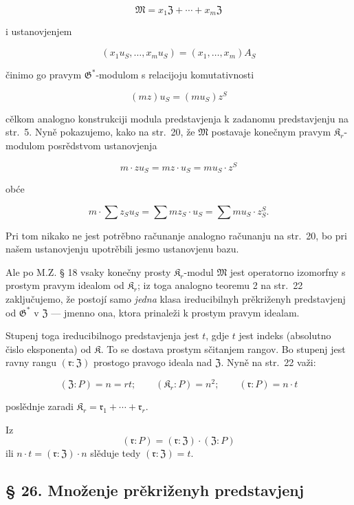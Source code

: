 \documentclass[11pt]{article}
\begin{document}
\[\mathfrak{M}=x_1\mathfrak{Z}+\cdots+x_m\mathfrak{Z}\]

i ustanovjenjem

\[(x_1u_S,\ldots,x_mu_S)=(x_1,\ldots,x_m)A_S\]

činimo go pravym \(\mathfrak G^*\)-modulom s relacijoju komutativnosti

\[(mz) u_S = (mu_S) z^S\]

cělkom analogno konstrukciji modula predstavjenja k zadanomu predstavjenju na str.~5. Nyně pokazujemo, kako na str.~20, že \(\mathfrak{M}\) postavaje konečnym pravym \(\mathfrak K_r\)-modulom posrědstvom ustanovjenja

\[m \cdot z u_S = mz \cdot u_S = mu_S \cdot z^S\]

obće

\[m \cdot \sum z_S u_S = \sum m z_S \cdot u_S = \sum m u_S \cdot z_S^S.\]

Pri tom nikako ne jest potrěbno računanje analogno računanju na str.~20, bo pri našem ustanovjenju upotrěbili jesmo ustanovjenu bazu.

Ale po M.Z. § 18 vsaky konečny prosty \(\mathfrak K_r\)-modul \(\mathfrak{M}\) jest operatorno izomorfny s prostym pravym idealom od \(\mathfrak K_r\); iz toga analogno teoremu 2 na str.~22 zaključujemo, že postojí samo \emph{jedna} klasa ireducibilnyh prěkriženyh predstavjenj od \(\mathfrak{G}^*\) v \(\mathfrak Z\) --- jmenno ona, ktora prinaleži k prostym pravym idealam.

Stupenj toga ireducibilnogo predstavjenja jest \(t\), gdje \(t\) jest indeks (absolutno čislo eksponenta) od \(\mathfrak K\). To se dostava prostym sčitanjem rangov. Bo stupenj jest ravny rangu \((\mathfrak r:\mathfrak Z)\) prostogo pravogo ideala nad \(\mathfrak Z\). Nyně na str.~22 važi:

\[
(\mathfrak Z:P)=n=rt;\qquad (\mathfrak K_r:P)=n^2;\qquad (\mathfrak r:P)=n\cdot t
\]

poslědnje zaradi \(\mathfrak K_r = \mathfrak{r}_1 + \cdots + \mathfrak{r}_r\).

Iz
\[(\mathfrak{r}: P) = (\mathfrak{r}: \mathfrak Z) \cdot (\mathfrak Z: P)\]
ili \(n \cdot t = (\mathfrak{r}: \mathfrak Z) \cdot n\) slěduje tedy \((\mathfrak{r}: \mathfrak Z) = t\).

\subsection*{§ 26. Množenje prěkriženyh predstavjenj}\label{multiplikation-der-verschraenkten-darstellungen}
\end{document}
